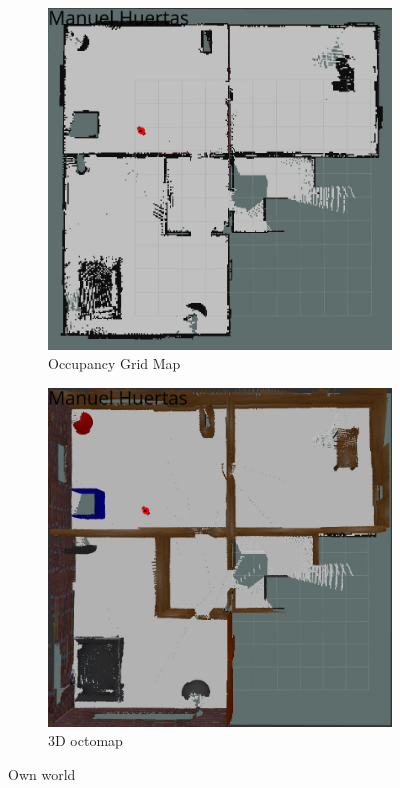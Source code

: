 \documentclass[10pt,journal,compsoc]{IEEEtran}
\begin{document}
\begin{figure}[h]
\centering
\begin{subfigure}[b]{0.2\textwidth}
\includegraphics[scale=0.12]{own-occupancy-grid-map}
\caption{Occupancy Grid Map}
\end{subfigure}
\begin{subfigure}[b]{0.2\textwidth}
\includegraphics[scale=0.12]{own-3d-map}
\caption{3D octomap}
\end{subfigure}
\caption{Own world}
\end{figure}
\end{document}
